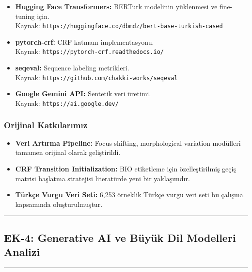 \documentclass[conference]{IEEEtran}
\begin{document}
\begin{itemize}
    \item \textbf{Hugging Face Transformers:} BERTurk modelinin yüklenmesi ve fine-tuning için. \\
    Kaynak: \texttt{https://huggingface.co/dbmdz/bert-base-turkish-cased}
    
    \item \textbf{pytorch-crf:} CRF katmanı implementasyonu. \\
    Kaynak: \texttt{https://pytorch-crf.readthedocs.io/}
    
    \item \textbf{seqeval:} Sequence labeling metrikleri. \\
    Kaynak: \texttt{https://github.com/chakki-works/seqeval}
    
    \item \textbf{Google Gemini API:} Sentetik veri üretimi. \\
    Kaynak: \texttt{https://ai.google.dev/}
\end{itemize}

\subsubsection*{Orijinal Katkılarımız}

\begin{itemize}
    \item \textbf{Veri Artırma Pipeline:} Focus shifting, morphological variation modülleri tamamen orijinal olarak geliştirildi.
    
    \item \textbf{CRF Transition Initialization:} BIO etiketleme için özelleştirilmiş geçiş matrisi başlatma stratejisi literatürde yeni bir yaklaşımdır.
    
    \item \textbf{Türkçe Vurgu Veri Seti:} 6,253 örneklik Türkçe vurgu veri seti bu çalışma kapsamında oluşturulmuştur.
\end{itemize}

\vspace{1cm}


\noindent\rule{\textwidth}{1pt}
\subsection*{\Large EK-4: Generative AI ve Büyük Dil Modelleri Analizi}
\noindent\rule{\textwidth}{0.5pt}
\end{document}
